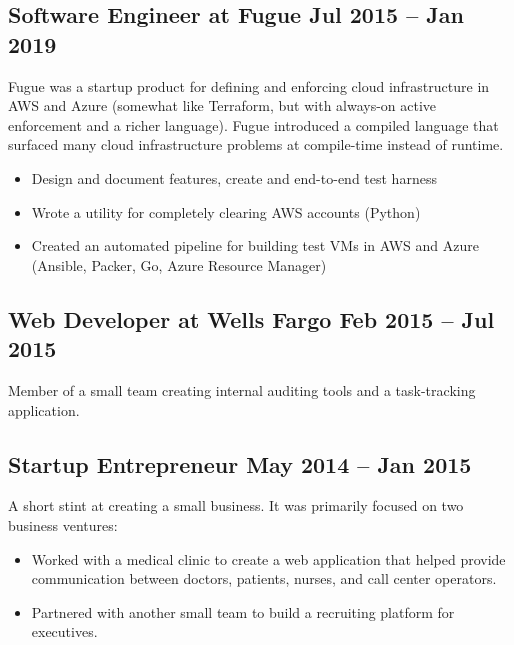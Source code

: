 \documentclass[12pt]{article}
\begin{document}
     
 

\subsection*{Software Engineer at Fugue \hfill Jul 2015 -- Jan 2019}

Fugue was a startup product for defining and enforcing cloud infrastructure in
AWS and Azure (somewhat like Terraform, but with always-on active enforcement
and a richer language). Fugue introduced a compiled language that surfaced many
cloud infrastructure problems at compile-time instead of runtime.

\begin{itemize}
  \item Design and document features, create and end-to-end test harness
  \item Wrote a utility for completely clearing AWS accounts (Python)
  \item Created an automated pipeline for building test VMs in AWS and Azure
    (Ansible, Packer, Go, Azure Resource Manager)
\end{itemize}

     
   

\subsection*{Web Developer at Wells Fargo \hfill Feb 2015 -- Jul 2015}

Member of a small team creating internal auditing tools and a task-tracking
application.

    

\subsection*{Startup Entrepreneur \hfill May 2014 -- Jan 2015}

A short stint at creating a small business. It was primarily focused on two
business ventures:

\begin{itemize}
\item Worked with a medical clinic to create a web application that helped
  provide communication between doctors, patients, nurses, and call center
  operators.

\item Partnered with another small team to build a recruiting platform for
  executives.
\end{itemize}
\end{document}
